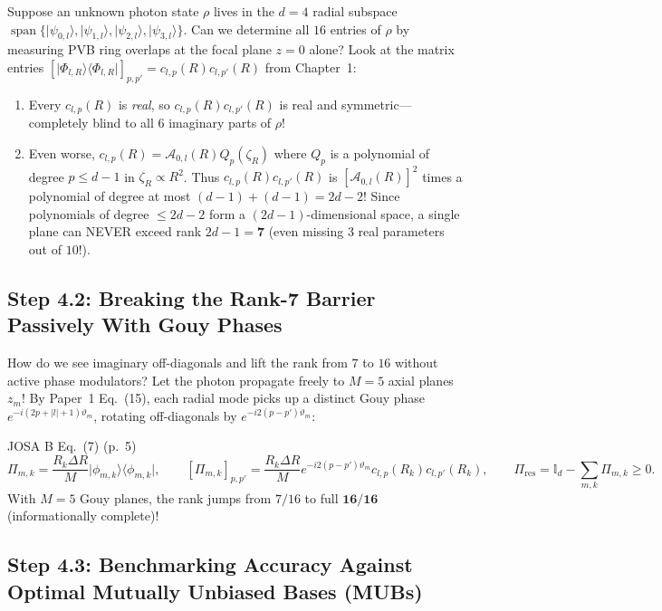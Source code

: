 \documentclass[10pt,letterpaper]{article}
\newcommand{\ket}[1]{\lvert #1 \rangle}
\newcommand{\bra}[1]{\langle #1 \rvert}
\newcommand{\abs}[1]{\lvert #1 \rvert}
\numberwithin{equation}{section}
\begin{document}
Suppose an unknown photon state $\rho$ lives in the $d = 4$ radial subspace $\operatorname{span}\{\ket{\psi_{0,l}}, \ket{\psi_{1,l}}, \ket{\psi_{2,l}}, \ket{\psi_{3,l}}\}$. Can we determine all $16$ entries of $\rho$ by measuring PVB ring overlaps at the focal plane $z = 0$ alone?
Look at the matrix entries $[\ket{\Phi_{l,R}}\bra{\Phi_{l,R}}]_{p,p'} = c_{l,p}(R) c_{l,p'}(R)$ from Chapter~1:
\begin{enumerate}[leftmargin=1.4em,itemsep=1pt,topsep=1pt]
  \item Every $c_{l,p}(R)$ is \emph{real}, so $c_{l,p}(R) c_{l,p'}(R)$ is real and symmetric---completely blind to all $6$ imaginary parts of $\rho$!
  \item Even worse, $c_{l,p}(R) = \mathcal{A}_{0,l}(R) Q_p(\zeta_R)$ where $Q_p$ is a polynomial of degree $p \le d-1$ in $\zeta_R \propto R^2$. Thus $c_{l,p}(R) c_{l,p'}(R)$ is $[\mathcal{A}_{0,l}(R)]^2$ times a polynomial of degree at most $(d-1)+(d-1) = 2d - 2$! Since polynomials of degree $\le 2d - 2$ form a $(2d-1)$-dimensional space, a single plane can NEVER exceed rank $2d - 1 = \mathbf{7}$ (even missing $3$ real parameters out of $10$!).
\end{enumerate}

\subsection{Step 4.2: Breaking the Rank-7 Barrier Passively With Gouy Phases}

How do we see imaginary off-diagonals and lift the rank from $7$ to $16$ without active phase modulators? Let the photon propagate freely to $M = 5$ axial planes $z_m$! By Paper~1 Eq.~(15), each radial mode picks up a distinct Gouy phase $e^{-i(2p+\abs{l}+1)\vartheta_m}$, rotating off-diagonals by $e^{-i 2(p-p')\vartheta_m}$:

\begin{paperhit}{JOSA B Eq.~(7) (p.~5)}
\[
  \Pi_{m,k} = \frac{R_k\Delta R}{M}\ket{\phi_{m,k}}\bra{\phi_{m,k}}, \qquad
  [\Pi_{m,k}]_{p,p'} = \frac{R_k\Delta R}{M} e^{-i 2(p-p')\vartheta_m} c_{l,p}(R_k) c_{l,p'}(R_k), \qquad
  \Pi_{\mathrm{res}} = \mathbb{I}_d - \sum_{m,k}\Pi_{m,k} \ge 0.
\]
With $M = 5$ Gouy planes, the rank jumps from $7/16$ to full $\mathbf{16/16}$ (informationally complete)!
\end{paperhit}

\subsection{Step 4.3: Benchmarking Accuracy Against Optimal Mutually Unbiased Bases (MUBs)}
\end{document}
